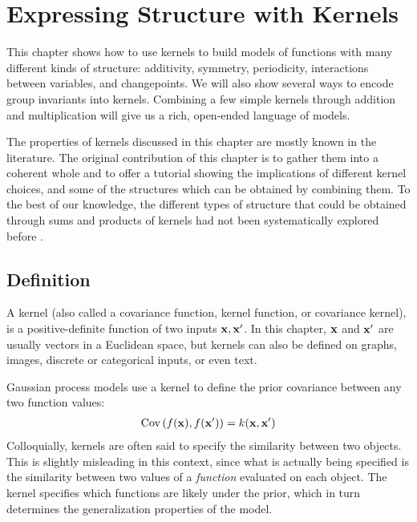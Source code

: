 
\inbpdocument

\chapter{Expressing Structure with Kernels}
\label{ch:kernels}

This chapter shows how to use kernels to build models of functions with many different kinds of structure: additivity, symmetry, periodicity, interactions between variables, and changepoints.
We will also show several ways to encode group invariants into kernels.
Combining a few simple kernels through addition and multiplication will give us a rich, open-ended language of models.

The properties of kernels discussed in this chapter are mostly known in the literature.
The original contribution of this chapter is to gather them into a coherent whole and to offer a tutorial showing the implications of different kernel choices, and some of the structures which can be obtained by combining them.
To the best of our knowledge, the different types of structure that could be obtained through sums and products of kernels had not been systematically explored before \citet{DuvLloGroetal13}.


\section{Definition}

A kernel (also called a covariance function, kernel function, or covariance kernel), is a positive-definite function of two inputs ${\bf{x}}, {\bf{x}}'$. %
In this chapter, ${\bf{x}}$ and ${\bf{x}}'$ are usually vectors in a Euclidean space, but kernels can also be defined on graphs, images, discrete or categorical inputs, or even text.

Gaussian process models use a kernel to define the prior covariance between any two function values:
%
\begin{align}
\textrm{Cov}\left(f({\bf{x}}), f({\bf{x}}') \right) = k({\bf{x}},{\bf{x}}')
\end{align}
%
Colloquially, kernels are often said to specify the similarity between two objects.
This is slightly misleading in this context, since what is actually being specified is the similarity between two values of a \emph{function} evaluated on each object.
The kernel specifies which functions are likely under the \gp{} prior, which in turn determines the generalization properties of the model.





